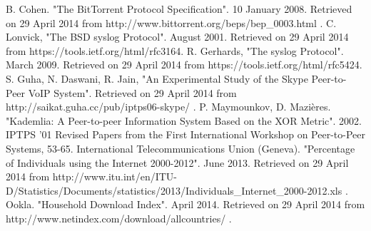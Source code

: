 \documentclass[12pt]{report}
\begin{document}
\begin{thebibliography}{11}
 B. Cohen. "The BitTorrent Protocol Specification". 10 January 2008. Retrieved on 29 April 2014 from http://www.bittorrent.org/beps/bep\_0003.html .
 C. Lonvick, "The BSD syslog Protocol". August 2001. Retrieved on 29 April 2014 from https://tools.ietf.org/html/rfc3164.
 R. Gerhards, "The syslog Protocol". March 2009. Retrieved on 29 April 2014 from https://tools.ietf.org/html/rfc5424.
 S. Guha, N. Daswani, R. Jain, "An Experimental Study of the Skype Peer-to-Peer VoIP System". Retrieved on 29 April 2014 from http://saikat.guha.cc/pub/iptps06-skype/ .
 P. Maymounkov, D. Mazi\`eres. "Kademlia: A Peer-to-peer Information System Based on the XOR Metric". 2002. IPTPS '01 Revised Papers from the First International Workshop on Peer-to-Peer Systems, 53-65.
 International Telecommunications Union (Geneva). "Percentage of Individuals using the Internet 2000-2012". June 2013. Retrieved on 29 April 2014 from http://www.itu.int/en/ITU-D/Statistics/Documents/statistics/2013/Individuals\_Internet\_2000-2012.xls .
 Ookla. "Household Download Index". April 2014. Retrieved on 29 April 2014 from http://www.netindex.com/download/allcountries/ .

\end{thebibliography}
\end{document}
